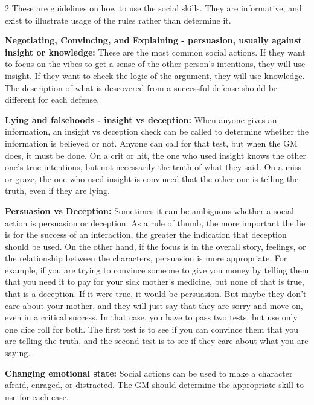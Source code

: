 \begin{multicols}{2}
These are guidelines on how to use the social skills. They are informative, and exist to illustrate usage of the rules rather than determine it.  

\textbf{Negotiating, Convincing, and Explaining - persuasion, usually against insight or knowledge:} These are the most common social actions. If they want to focus on the vibes to get a sense of the other person's intentions, they will use insight. If they want to check the logic of the argument, they will use knowledge. The description of what is descovered from a successful defense should be different for each defense.  

\textbf{Lying and falsehoods - insight vs deception:} When anyone gives an information, an insight vs deception check can be called to determine whether the information is believed or not. Anyone can call for that test, but when the GM does, it must be done. On a crit or hit, the one who used insight knows the other one's true intentions, but not necessarily the truth of what they said. On a miss or graze, the one who used insight is convinced that the other one is telling the truth, even if they are lying. 

\textbf{Persuasion vs Deception:} Sometimes it can be ambiguous whether a social action is persuasion or deception. As a rule of thumb, the more important the lie is for the success of an interaction, the greater the indication that deception should be used. On the other hand, if the focus is in the overall story, feelings, or the relationship between the characters, persuasion is more appropriate. For example, if you are trying to convince someone to give you money by telling them that you need it to pay for your sick mother's medicine, but none of that is true, that is a deception. If it were true, it would be persuasion. But maybe they don't care about your mother, and they will just say that they are sorry and move on, even in a critical success. In that case, you have to pass two tests, but use only one dice roll for both. The first test is to see if you can convince them that you are telling the truth, and the second test is to see if they care about what you are saying.  

\textbf{Changing emotional state:} Social actions can be used to make a character afraid, enraged, or distracted. The GM should determine the appropriate skill to use for each case. 


\end{multicols}
